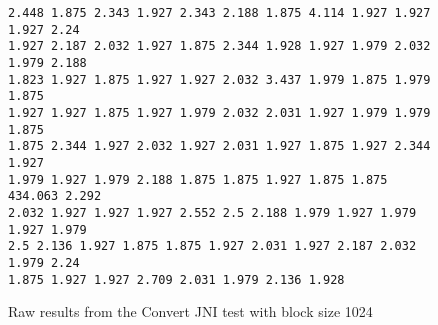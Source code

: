 %         
%         
%         
%         
%         
%         

\begin{figure}
    \begin{verbatim}
2.448 1.875 2.343 1.927 2.343 2.188 1.875 4.114 1.927 1.927 1.927 2.24
1.927 2.187 2.032 1.927 1.875 2.344 1.928 1.927 1.979 2.032 1.979 2.188
1.823 1.927 1.875 1.927 1.927 2.032 3.437 1.979 1.875 1.979 1.875
1.927 1.927 1.875 1.927 1.979 2.032 2.031 1.927 1.979 1.979 1.875
1.875 2.344 1.927 2.032 1.927 2.031 1.927 1.875 1.927 2.344 1.927
1.979 1.927 1.979 2.188 1.875 1.875 1.927 1.875 1.875 434.063 2.292
2.032 1.927 1.927 1.927 2.552 2.5 2.188 1.979 1.927 1.979 1.927 1.979
2.5 2.136 1.927 1.875 1.875 1.927 2.031 1.927 2.187 2.032 1.979 2.24
1.875 1.927 1.927 2.709 2.031 1.979 2.136 1.928 
    \end{verbatim}
    \caption{Raw results from the Convert JNI test with block size 1024}
    \label{fig:raw:jni:convert:1024}
\end{figure}

